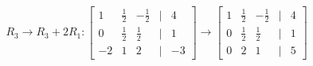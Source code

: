 \documentclass[preview]{standalone}
\begin{document}
\begin{align*}
R_3 \rightarrow R_3 + 2R_1: \begin{bmatrix} 1 & \frac{1}{2} & -\frac{1}{2} & | & 4 \\ 0 & \frac{1}{2} & \frac{1}{2} & | & 1 \\ -2 & 1 & 2 & | & -3 \end{bmatrix} \rightarrow \begin{bmatrix} 1 & \frac{1}{2} & -\frac{1}{2} & | & 4 \\ 0 & \frac{1}{2} & \frac{1}{2} & | & 1 \\ 0 & 2 & 1 & | & 5 \end{bmatrix}
\end{align*}
\end{document}
